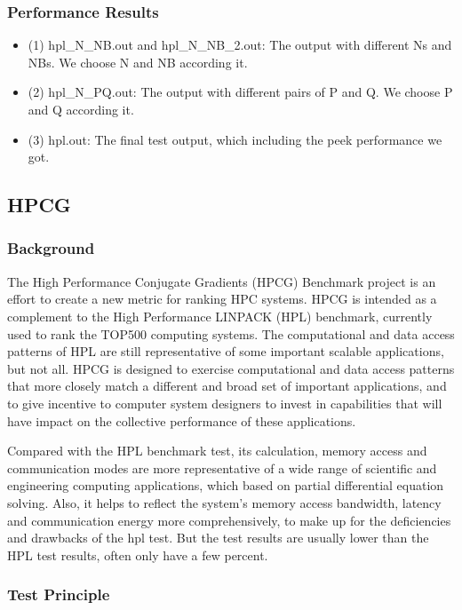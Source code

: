 \documentclass[a4paper,12pt]{article}
\begin{document}
\subsubsection{Performance Results}
\begin{itemize}
    \item (1) hpl\_N\_NB.out and hpl\_N\_NB\_2.out: The output with different Ns and NBs. We choose N and NB according it.
    \item (2) hpl\_N\_PQ.out: The output with different pairs of P and Q. We choose P and Q according it.
    \item (3) hpl.out: The final test output, which including the peek performance we got.
\end{itemize}

\subsection{HPCG}

\subsubsection{Background}

The High Performance Conjugate Gradients (HPCG) Benchmark project is an effort to create a new metric for ranking HPC systems. HPCG is intended as a complement to the High Performance LINPACK (HPL) benchmark, currently used to rank the TOP500 computing systems. The computational and data access patterns of HPL are still representative of some important scalable applications, but not all. HPCG is designed to exercise computational and data access patterns that more closely match a different and broad set of important applications, and to give incentive to computer system designers to invest in capabilities that will have impact on the collective performance of these applications.

Compared with the HPL benchmark test, its calculation, memory access and communication modes are more representative of a wide range of scientific and engineering computing applications, which based on partial differential equation solving. Also, it helps to reflect the system's memory access bandwidth, latency and communication energy more comprehensively, to make up for the deficiencies and drawbacks of the hpl test. But the test results are usually lower than the HPL test results, often only have a few percent.

\subsubsection{Test Principle}
\end{document}
